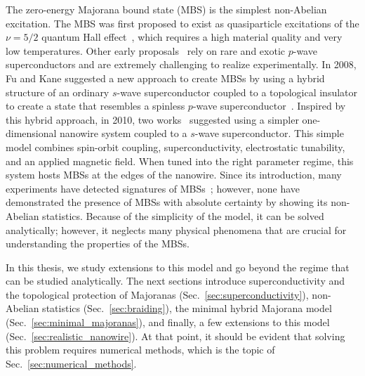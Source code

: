 The zero-energy Majorana bound state (MBS) is the simplest non-Abelian excitation.
The MBS was first proposed to exist as quasiparticle excitations of the $\nu = 5/2$ quantum Hall effect~\cite{Read2000,Moore1991}, which requires a high material quality and very low temperatures.
Other early proposals~\cite{Gurarie2005,Sarma2006,Tewari2007} rely on rare and exotic $p$-wave superconductors and are extremely challenging to realize experimentally.
In 2008, Fu and Kane suggested a new approach to create MBSs by using a hybrid structure of an ordinary $s$-wave superconductor coupled to a topological insulator to create a state that resembles a spinless $p$-wave superconductor~\cite{Fu2008}.
Inspired by this hybrid approach, in 2010, two works~\cite{Lutchyn2010,Oreg2010} suggested using a simpler one-dimensional nanowire system coupled to a $s$-wave superconductor.
This simple model combines spin-orbit coupling, superconductivity, electrostatic tunability, and an applied magnetic field.
When tuned into the right parameter regime, this system hosts MBSs at the edges of the nanowire.
Since its introduction, many experiments have detected signatures of MBSs~\cite{Mourik2012,Das2012,Deng2012,Deng2016,Deng2016a,Chen2017a}; however, none have demonstrated the presence of MBSs with absolute certainty by showing its non-Abelian statistics.
Because of the simplicity of the model, it can be solved analytically; however, it neglects many physical phenomena that are crucial for understanding the properties of the MBSs.

In this thesis, we study extensions to this model and go beyond the regime that can be studied analytically.
The next sections introduce superconductivity and the topological protection of Majoranas (Sec.~\ref{sec:superconductivity}), non-Abelian statistics (Sec.~\ref{sec:braiding}), the minimal hybrid Majorana model (Sec.~\ref{sec:minimal_majoranas}), and finally, a few extensions to this model (Sec.~\ref{sec:realistic_nanowire}).
At that point, it should be evident that solving this problem requires numerical methods, which is the topic of Sec.~\ref{sec:numerical_methods}.




